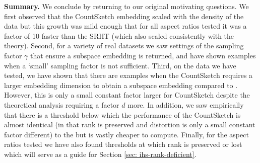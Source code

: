 \medskip
\noindent
\textbf{Summary.}
We conclude  by returning to our original motivating questions.
We first observed that the CountSketch embedding scaled with the density of the
 data but this growth was mild enough that for all aspect ratios tested it was
 a factor of 10 faster than the SRHT (which also scaled consistently with the
 theory).
 Second, for a variety of real datasets we saw settings of the
 sampling factor $\gamma$ that ensure a subspace embedding is
 returned, and have shown examples when a `small' sampling factor is not sufficient.
Third, on the data we have tested, we have shown that there are examples
 when the CountSketch requires a larger embedding dimension to obtain a subspace
 embedding compared to \SRHT.
 However, this is only a small constant factor
 larger for CountSketch despite the theoretical analysis requiring a factor $d$ more.
 In addition, we saw empirically that there is a threshold below
 which the performance of the CountSketch is almost identical (in that rank is
 preserved and distortion is only a small constant factor different) to the \SRHT
 but is vastly cheaper to compute.
 Finally, for the aspect ratios tested we have also found thresholds at which
 rank is preserved or lost which will serve as a guide for Section
 \ref{sec: ihs-rank-deficient}.
